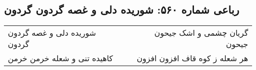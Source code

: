 \begin{center}
\section*{رباعی شماره ۵۶۰: شوریده دلی و غصه گردون گردون}
\label{sec:sh560}
\begin{longtable}{l p{0.5cm} r}
شوریده دلی و غصه گردون گردون
&&
گریان چشمی و اشک جیحون جیحون
\\
کاهیده تنی و شعله خرمن خرمن
&&
هر شعله ز کوه قاف افزون افزون
\\
\end{longtable}
\end{center}
